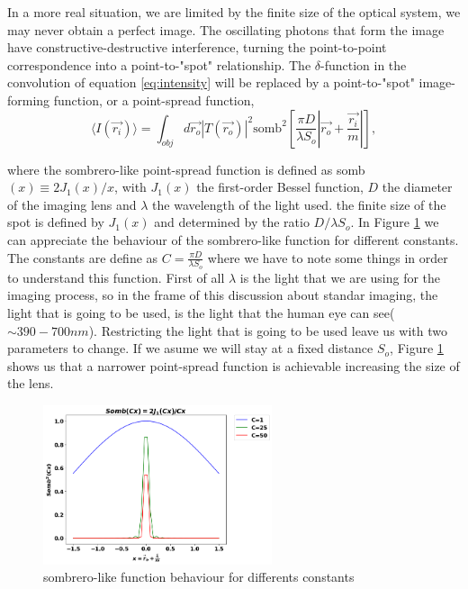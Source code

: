 In a more real situation, we are limited by the finite size of the optical system, we may never obtain a perfect image.
The oscillating photons that form the image have constructive-destructive interference, turning the point-to-point correspondence into 
 a point-to-"spot" relationship. The $\delta$-function in the convolution of equation \ref{eq:intensity}
will be replaced by a point-to-"spot" image-forming function, or a point-spread function,
\begin{equation}
\label{eq:realIntensity}
\langle I(\vec{r_i}) \rangle =\int_{obj} d\vec{r_o} |T(\vec{r_o})|^2 \text{somb}^2[\frac{\pi D}{\lambda S_o} | \vec{r_o}+\frac{\vec{r_i}}{m}|],
\end{equation}

where the sombrero-like point-spread function is defined as 
somb$(x) \equiv  2J_1(x)/x$, with $J_1(x)$ the first-order Bessel function, $D$ the diameter of the imaging lens and $\lambda$ the wavelength of the light used.
the finite size of the spot is defined by $J_1(x)$ and 
determined by the ratio $D / \lambda S_o$. In Figure \ref{fig:bessel} we can appreciate the behaviour of the sombrero-like function for different
constants. The constants are define as $C=\frac{\pi D}{\lambda S_o}$ where we have to note some things in order to understand 
this function. First of all $\lambda$ is the light that we are using for the imaging process, so in the frame of this discussion 
about standar imaging, the light that is going to be used, is the light that the human eye can see($\sim 390-700 nm$). Restricting the light that
is going to be used leave us with two parameters to change. If we asume we will stay at a fixed distance $S_o$, Figure \ref{fig:bessel} shows
us that a narrower point-spread function is achievable increasing the size of the lens.
 
   



\begin{figure}[h!]
\centering
\includegraphics[width=0.6\textwidth]{Figures/bessel.png} 
\caption{sombrero-like function behaviour for differents constants }
\label{fig:bessel}
\end{figure}


